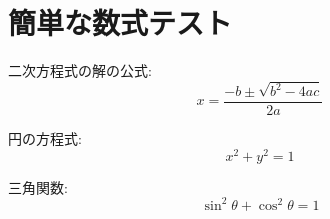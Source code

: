 \documentclass{article}
\begin{document}
\section{簡単な数式テスト}

二次方程式の解の公式:
$$x = \frac{-b \pm \sqrt{b^2 - 4ac}}{2a}$$

円の方程式:
$$x^2 + y^2 = 1$$

三角関数:
$$\sin^2\theta + \cos^2\theta = 1$$
\end{document}
